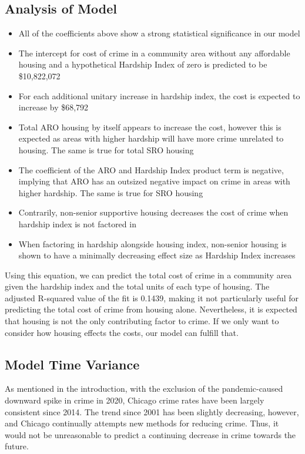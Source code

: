\documentclass{article}
\begin{document}
\begin{onehalfspacing}
\subsection{Analysis of Model}
\begin{itemize}
    \item All of the coefficients above show a strong statistical significance in our model
    \item The intercept for cost of crime in a community area without any affordable housing and a hypothetical Hardship Index of zero is predicted to be \$10,822,072
    \item For each additional unitary increase in hardship index, the cost is expected to increase by \$68,792
    \item Total ARO housing by itself appears to increase the cost, however this is expected as areas with higher hardship will have more crime unrelated to housing. The same is true for total SRO housing
    \item The coefficient of the ARO and Hardship Index product term is negative, implying that ARO has an outsized negative impact on crime in areas with higher hardship. The same is true for SRO housing
    \item Contrarily, non-senior supportive housing decreases the cost of crime when hardship index is not factored in
    \item When factoring in hardship alongside housing index, non-senior housing is shown to have a minimally decreasing effect size as Hardship Index increases
\end{itemize}

Using this equation, we can predict the total cost of crime in a community area given the hardship index and the total units of each type of housing. The adjusted R-squared value of the fit is 0.1439, making it not particularly useful for predicting the total cost of crime from housing alone. Nevertheless, it is expected that housing is not the only contributing factor to crime. If we only want to consider how housing effects the costs, our model can fulfill that.

\subsection{Model Time Variance}
As mentioned in the introduction, with the exclusion of the pandemic-caused downward spike in crime in 2020, Chicago crime rates have been largely consistent since 2014. The trend since 2001 has been slightly decreasing, however, and Chicago continually attempts new methods for reducing crime. Thus, it would not be unreasonable to predict a continuing decrease in crime towards the future.


\end{onehalfspacing}
\end{document}
